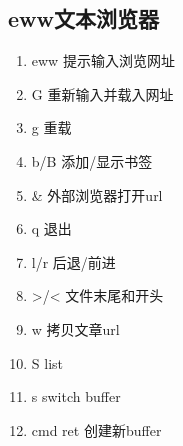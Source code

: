 \documentclass[11pt]{article}
\begin{document}
\subsection{eww文本浏览器}
\label{sec:org75cb17a}
\begin{enumerate}
\item eww 提示输入浏览网址\\
\item G   重新输入并载入网址\\
\item g   重载\\
\item b/B   添加/显示书签\\
\item \&   外部浏览器打开url\\
\item q   退出\\
\item l/r 后退/前进\\
\item >/< 文件末尾和开头\\
\item w   拷贝文章url\\
\item S   list\\
\item s   switch buffer\\
\item cmd ret 创建新buffer\\
\end{enumerate}
\end{document}
